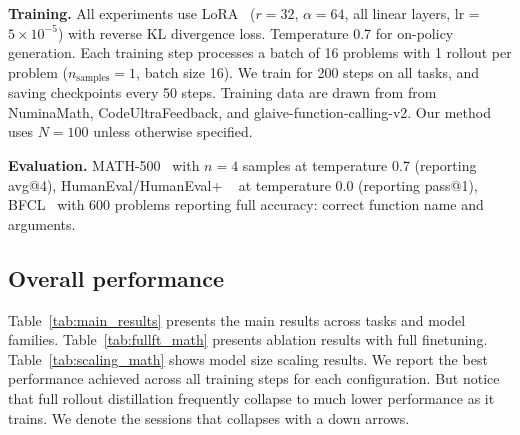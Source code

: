 \documentclass{article}
\begin{document}
\textbf{Training.} All experiments use LoRA~\citep{hu2022lora} ($r{=}32$, $\alpha{=}64$, all linear layers, lr = $5{\times}10^{-5}$) with reverse KL divergence loss. Temperature 0.7 for on-policy generation. Each training step processes a batch of 16 problems with 1 rollout per problem ($n_{\text{samples}}{=}1$, batch size 16). We train for 200 steps on all tasks, and saving checkpoints every 50 steps. Training data are drawn from from NuminaMath, CodeUltraFeedback, and glaive-function-calling-v2. Our method uses $N{=}100$ unless otherwise specified.

\textbf{Evaluation.} MATH-500~\citep{hendrycks2021measuring, lightman2023verify} with $n{=}4$ samples at temperature 0.7 (reporting avg@4), HumanEval/HumanEval+ ~\citep{chen2021evaluating, austin2021program, liu2024evalplus} at temperature 0.0 (reporting pass@1), BFCL~\citep{yan2024bfcl} with 600 problems reporting full accuracy: correct function name and arguments.

\subsection{Overall performance}
\label{sec:main_results_sub}

Table~\ref{tab:main_results} presents the main results across tasks and model families. Table~\ref{tab:fullft_math} presents ablation results with full finetuning. Table~\ref{tab:scaling_math} shows model size scaling results. We report the best performance achieved across all training steps for each configuration. But notice that full rollout distillation frequently collapse to much lower performance as it trains. We denote the sessions that collapses with a down arrows.
\end{document}
